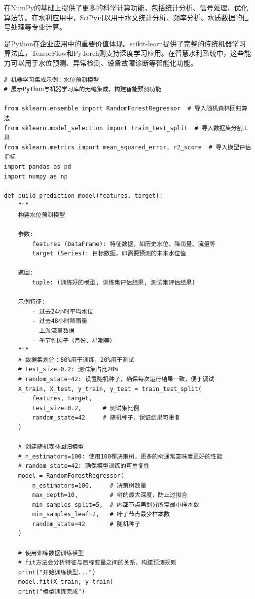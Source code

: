 在NumPy的基础上提供了更多的科学计算功能，包括统计分析、信号处理、优化算法等。在水利应用中，SciPy可以用于水文统计分析、频率分析、水质数据的信号处理等专业计算。

是Python在企业应用中的重要价值体现。scikit-learn提供了完整的传统机器学习算法库，TensorFlow和PyTorch则支持深度学习应用。在智慧水利系统中，这些能力可以用于水位预测、异常检测、设备故障诊断等智能化功能。

\begin{lstlisting}[style=python]
# 机器学习集成示例：水位预测模型
# 展示Python与机器学习库的无缝集成，构建智能预测功能

from sklearn.ensemble import RandomForestRegressor  # 导入随机森林回归算法
from sklearn.model_selection import train_test_split  # 导入数据集分割工具
from sklearn.metrics import mean_squared_error, r2_score  # 导入模型评估指标
import pandas as pd
import numpy as np

def build_prediction_model(features, target):
    """
    构建水位预测模型
    
    参数:
        features (DataFrame): 特征数据，如历史水位、降雨量、流量等
        target (Series): 目标数据，即需要预测的未来水位值
        
    返回:
        tuple: (训练好的模型, 训练集评估结果, 测试集评估结果)
        
    示例特征:
        - 过去24小时平均水位
        - 过去48小时降雨量
        - 上游流量数据
        - 季节性因子（月份、星期等）
    """
    # 数据集划分：80%用于训练，20%用于测试
    # test_size=0.2: 测试集占比20%
    # random_state=42: 设置随机种子，确保每次运行结果一致，便于调试
    X_train, X_test, y_train, y_test = train_test_split(
        features, target, 
        test_size=0.2,      # 测试集比例
        random_state=42     # 随机种子，保证结果可重复
    )
    
    # 创建随机森林回归模型
    # n_estimators=100: 使用100棵决策树，更多的树通常意味着更好的性能
    # random_state=42: 确保模型训练的可重复性
    model = RandomForestRegressor(
        n_estimators=100,     # 决策树数量
        max_depth=10,         # 树的最大深度，防止过拟合
        min_samples_split=5,  # 内部节点再划分所需最小样本数
        min_samples_leaf=2,   # 叶子节点最少样本数
        random_state=42       # 随机种子
    )
    
    # 使用训练数据训练模型
    # fit方法会分析特征与目标变量之间的关系，构建预测规则
    print("开始训练模型...")
    model.fit(X_train, y_train)
    print("模型训练完成")
    

\end{lstlisting}
